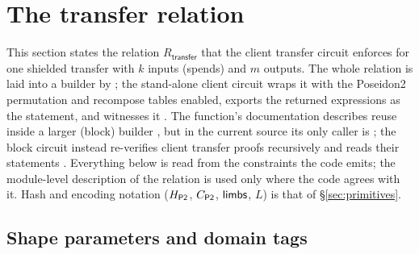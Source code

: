 \section{The transfer relation}
\label{sec:transfer}

This section states the relation $R_{\mathsf{transfer}}$ that the client
transfer circuit enforces for one shielded transfer with $k$ inputs (spends) and
$m$ outputs. The whole relation is laid into a builder by
 ; the
stand-alone client circuit wraps it with the Poseidon2 permutation and
recompose tables enabled, exports the returned expressions as the statement,
and witnesses it . The function's
documentation describes reuse inside a larger (block) builder
, but in the current source its only
caller is 
; the block circuit instead re-verifies
client transfer proofs recursively and reads their statements
. Everything below is read from the
constraints the code emits; the module-level description of the relation
 is used only where the code agrees
with it. Hash and encoding notation ($H_{\mathsf{P2}}$, $C_{\mathsf{P2}}$, $\mathsf{limbs}$, $L$) is that of
\S\ref{sec:primitives}.

\subsection{Shape parameters and domain tags}

